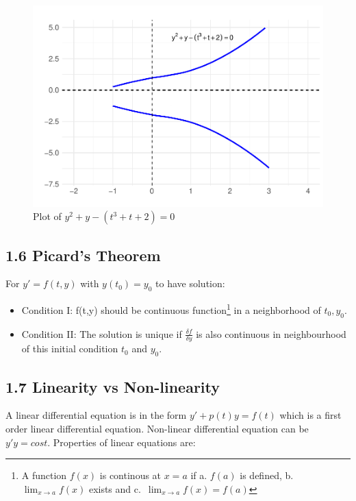 \documentclass[
  11pt,
]{article}
\providecommand{\tightlist}{%
  \setlength{\itemsep}{0pt}\setlength{\parskip}{0pt}}
\begin{document}
\begin{figure}
\centering
\includegraphics{differential_files/figure-latex/difference4-1.pdf}
\caption{Plot of \(y^2+y-(t^3+t+2)=0\)}
\end{figure}

\subsection{1.6 Picard's Theorem}\label{picards-theorem}

For \(y' = f(t,y)\) with \(y(t_0)=y_0\) to have solution:

\begin{itemize}
\tightlist
\item
  Condition I: f(t,y) should be continuous function\footnote{A function
    \(f(x)\) is continous at \(x=a\) if a. \(f(a)\) is defined, b.
    \(\lim_{x \to a} f(x)\) exists and c.~\(\lim_{x \to a} f(x) = f(a)\)}
  in a neighborhood of \(t_0,y_0\).
\item
  Condition II: The solution is unique if \(\frac{\delta f}{\delta y}\)
  is also continuous in neighbourhood of this initial condition \(t_0\)
  and \(y_0\).\\
\end{itemize}

\subsection{1.7 Linearity vs
Non-linearity}\label{linearity-vs-non-linearity}

A linear differential equation is in the form \(y'+p(t)y=f(t)\) which is
a first order linear differential equation. Non-linear differential
equation can be \(y'y=cost\). Properties of linear equations are:
\end{document}
